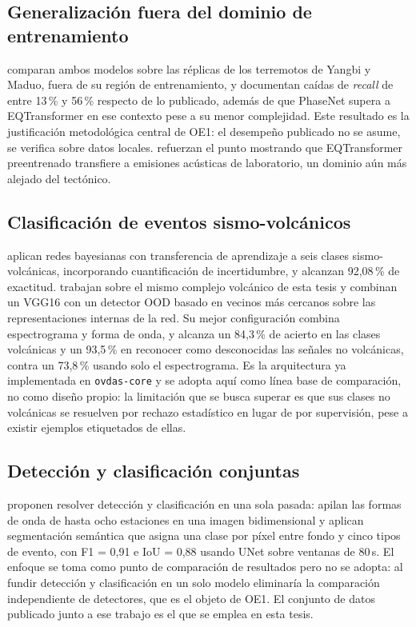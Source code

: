 \subsection{Generalización fuera del dominio de entrenamiento}

\textcite{jiang2021comparacion} comparan ambos modelos sobre las réplicas de
los terremotos de Yangbi y Maduo, fuera de su región de entrenamiento, y
documentan caídas de \emph{recall} de entre 13\,\% y 56\,\% respecto de lo
publicado, además de que PhaseNet supera a EQTransformer en ese contexto pese a
su menor complejidad. Este resultado es la justificación metodológica central de
OE1: el desempeño publicado no se asume, se verifica sobre datos locales.
\textcite{sheehan2025eqtlab} refuerzan el punto mostrando que EQTransformer
preentrenado transfiere a emisiones acústicas de laboratorio, un dominio aún más
alejado del tectónico.

\subsection{Clasificación de eventos sismo-volcánicos}

\textcite{bueno2020bnn} aplican redes bayesianas con transferencia de
aprendizaje a seis clases sismo-volcánicas, incorporando cuantificación de
incertidumbre, y alcanzan 92,08\,\% de exactitud.
\textcite{espinosacurilem2025ood} trabajan sobre el mismo complejo volcánico de
esta tesis y combinan un VGG16 con un detector OOD basado en vecinos más
cercanos sobre las representaciones internas de la red. Su mejor configuración
combina espectrograma y forma de onda, y alcanza un 84,3\,\% de acierto en las
clases volcánicas y un 93,5\,\% en reconocer como desconocidas las señales no
volcánicas, contra un 73,8\,\% usando solo el espectrograma. Es la arquitectura ya implementada en
\texttt{ovdas-core} y se adopta aquí como línea base de comparación, no como
diseño propio: la limitación que se busca superar es que sus clases no
volcánicas se resuelven por rechazo estadístico en lugar de por supervisión,
pese a existir ejemplos etiquetados de ellas.

\subsection{Detección y clasificación conjuntas}

\textcite{espinosacurilem2026segmentacion} proponen resolver detección y
clasificación en una sola pasada: apilan las formas de onda de hasta ocho
estaciones en una imagen bidimensional y aplican segmentación semántica que
asigna una clase por píxel entre fondo y cinco tipos de evento, con F1 = 0,91 e
IoU = 0,88 usando UNet sobre ventanas de 80\,s. El enfoque se toma como punto de
comparación de resultados pero no se adopta: al fundir detección y clasificación
en un solo modelo eliminaría la comparación independiente de detectores, que es
el objeto de OE1. El conjunto de datos publicado junto a ese trabajo
\parencite{espinosacurilem2025dataset} es el que se emplea en esta tesis.

